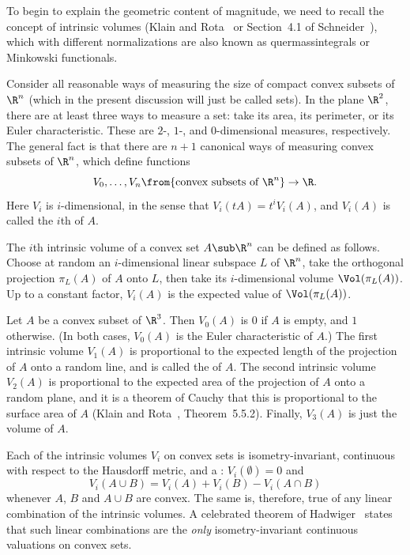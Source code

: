 To begin to explain the geometric content of magnitude, we need to recall
the concept of intrinsic volumes (Klain and Rota~\cite{KlRo} or Section~4.1
of Schneider~\cite{SchnCBB2}), which with different normalizations are also
known as quermassintegrals or Minkowski functionals.

Consider all reasonable ways of measuring the size of compact convex
subsets of $\R^n$ (which in the present discussion will just be called
%
%
%
sets).  In the plane $\R^2$, there are at least three ways to measure a
set: take its area, its perimeter, or its Euler characteristic.  These are
$2$-, $1$-, and $0$-dimensional measures, respectively.  The general fact
is that there are $n + 1$ canonical ways of measuring convex subsets of
$\R^n$, which define functions
\[
V_0, \ldots, V_n \from \{\text{convex subsets of } \R^n\} \to \R.
\]
Here $V_i$ is $i$-dimensional, in the sense that $V_i(tA) = t^i V_i(A)$,
and $V_i(A)$ is called the $i$th  of $A$.

The $i$th intrinsic volume of a convex set $A \sub \R^n$ can be defined as
follows.  Choose at random an $i$-dimensional linear subspace $L$ of
$\R^n$, take the orthogonal projection $\pi_L(A)$ of $A$ onto $L$, then
take its $i$-dimensional volume $\Vol(\pi_L(A))$.  Up to a constant factor,
$V_i(A)$ is the expected value of $\Vol(\pi_L(A))$.

\begin{example}
Let $A$ be a convex subset of $\R^3$. Then $V_0(A)$ is $0$ if $A$ is empty,
and $1$ otherwise. (In both cases, $V_0(A)$ is the Euler%
%
% 
characteristic of $A$.) The first intrinsic volume $V_1(A)$ is proportional
to the expected length of the projection of $A$ onto a random line, and is
called the  of $A$.  The second intrinsic volume $V_2(A)$ is proportional to the
expected area of the projection of $A$ onto a random plane, and it is a theorem
of Cauchy%
% 
%
% 
that this is proportional to the surface area of $A$ (Klain and
Rota~\cite{KlRo}, Theorem~5.5.2). Finally, $V_3(A)$ is just the volume of
$A$.
\end{example}

Each of the intrinsic volumes $V_i$ on convex sets is isometry-invariant,
continuous with respect to the Hausdorff metric, and a
: $V_i(\emptyset) = 0$ and 
\[
V_i(A \cup B) = V_i(A) + V_i(B) - V_i(A \cap B)
\]
whenever $A$, $B$ and $A \cup B$ are convex.  The same is, therefore, true
of any linear combination of the intrinsic volumes.  A celebrated theorem
of Hadwiger~\cite{Hadw}%
%
%
states that such linear combinations are the \emph{only}
isometry-invariant continuous valuations on convex sets.


